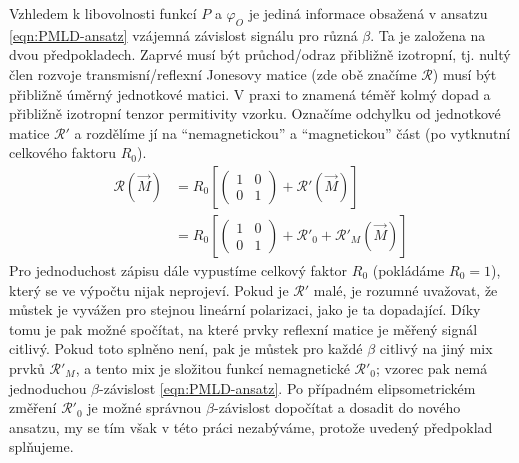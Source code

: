 Vzhledem k libovolnosti funkcí $P$ a $\varphi_O$ je jediná informace obsažená v ansatzu \eqref{eqn:PMLD-ansatz} vzájemná závislost signálu pro různá $\beta$.
Ta je založena na dvou předpokladech.
Zaprvé musí být průchod/odraz přibližně izotropní, tj. nultý člen rozvoje transmisní/reflexní Jonesovy matice (zde obě značíme $\mathcal{R}$) musí být přibližně úměrný jednotkové matici.
V praxi to znamená téměř kolmý dopad a přibližně izotropní tenzor permitivity vzorku.
Označíme odchylku od jednotkové matice $\mathcal{R}'$ a rozdělíme jí na ``nemagnetickou'' a ``magnetickou'' část (po vytknutní celkového faktoru $R_0$).
\begin{align}
\label{eqn:PMLD-Jones}
\mathcal{R}(\vec{M}) &= R_0 \left[ \begin{pmatrix} 1&0\\0&1 \end{pmatrix} + \mathcal{R}'(\vec{M}) \right] \\
                     &= R_0 \left[ \begin{pmatrix} 1&0\\0&1 \end{pmatrix} + \mathcal{R}'_0 + \mathcal{R}'_M(\vec{M}) \right]
\end{align}
Pro jednoduchost zápisu dále vypustíme celkový faktor $R_0$ (pokládáme $R_0=1$), který se ve výpočtu nijak neprojeví.
Pokud je $\mathcal{R}'$ malé, je rozumné uvažovat, že můstek je vyvážen pro stejnou lineární polarizaci, jako je ta dopadající.
Díky tomu je pak možné spočítat, na které prvky reflexní matice je měřený signál citlivý.
Pokud toto splněno není, pak je můstek pro každé $\beta$ citlivý na jiný mix prvků $\mathcal{R}'_M$, a tento mix je složitou funkcí nemagnetické $\mathcal{R}'_0$; vzorec pak nemá jednoduchou $\beta$-závislost \eqref{eqn:PMLD-ansatz}.
Po případném elipsometrickém změření $\mathcal{R}'_0$ je možné správnou $\beta$-závislost dopočítat a dosadit do nového ansatzu, my se tím však v této práci nezabýváme, protože uvedený předpoklad splňujeme.

